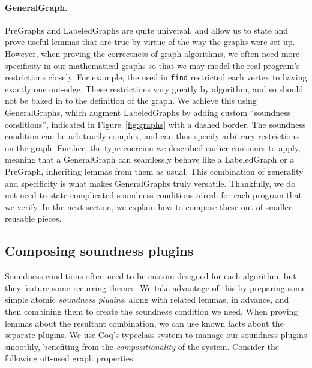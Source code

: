 \vspace{-0.75ex}
\paragraph{GeneralGraph.}


PreGraphs and LabeledGraphs are quite universal, and allow us to state
and prove useful lemmas that are true by virtue of the way the graphs
were set up. However, when proving the correctness of graph
algorithms, we often need more specificity in our mathematical graphs
so that we may model the real program's restrictions closely. 
For example, the  used in \texttt{find} 
restricted each vertex to having exactly one out-edge.  
These restrictions vary greatly by algorithm, and so should 
not be baked in to the definition of the graph. 
We achieve this using GeneralGraphs, which augment 
LabeledGraphs by adding custom ``soundness conditions'', indicated in
Figure~\ref{fig:graphs} with a dashed border.  
The soundness condition can be arbitrarily
complex, and can thus specify arbitrary restrictions on the graph.
Further, the type coercion we described earlier continues to apply, 
meaning that a GeneralGraph can seamlessly behave like a 
LabeledGraph or a PreGraph, inheriting lemmas from them as usual.
This combination of generality and specificity is 
what makes GeneralGraphs truly versatile. Thankfully, we do
not need to state complicated soundness conditions afresh for
each program that we verify. In the next section, we explain how to
compose these out of smaller, reusable pieces.

\subsection{Composing soundness plugins}
\label{subsec:graphplugins}

Soundness conditions often need to be custom-designed 
for each algorithm, but they feature some recurring themes.
We take advantage of this by preparing some simple atomic 
\emph{soundness plugins}, along with related lemmas, in advance, 
and then combining them to create the soundness condition we need.
When proving lemmas about the resultant combination, we can use known
facts about the separate plugins. 
We use Coq's typeclass system to manage our soundness plugins
smoothly, benefiting from the \emph{compositionality} of the system.
Consider the following oft-used graph properties:

